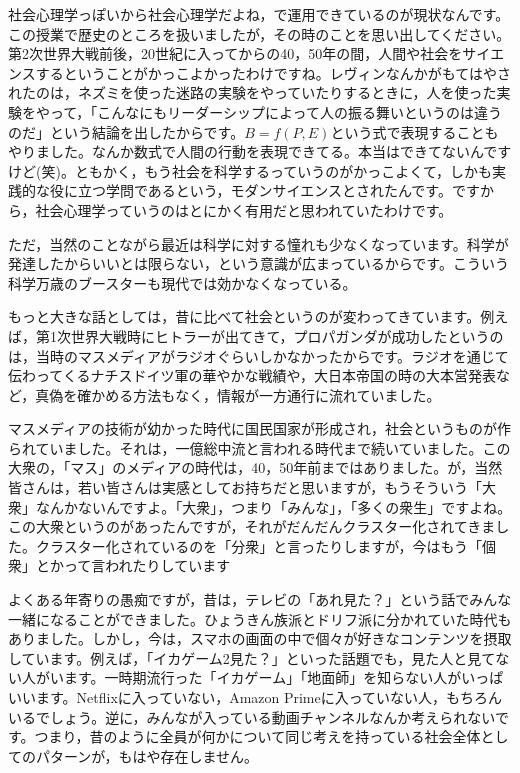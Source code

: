 \documentclass{ltjsbook}
\begin{document}
社会心理学っぽいから社会心理学だよね，で運用できているのが現状なんです。この授業で歴史のところを扱いましたが，その時のことを思い出してください。第2次世界大戦前後，20世紀に入ってからの40，50年の間，人間や社会をサイエンスするということがかっこよかったわけですね。レヴィンなんかがもてはやされたのは，ネズミを使った迷路の実験をやっていたりするときに，人を使った実験をやって，「こんなにもリーダーシップによって人の振る舞いというのは違うのだ」という結論を出したからです。$B=f(P,E)$という式で表現することもやりました。なんか数式で人間の行動を表現できてる。本当はできてないんですけど(笑)。ともかく，もう社会を科学するっていうのがかっこよくて，しかも実践的な役に立つ学問であるという，モダンサイエンスとされたんです。ですから，社会心理学っていうのはとにかく有用だと思われていたわけです。

ただ，当然のことながら最近は科学に対する憧れも少なくなっています。科学が発達したからいいとは限らない，という意識が広まっているからです。こういう科学万歳のブースターも現代では効かなくなっている。

もっと大きな話としては，昔に比べて社会というのが変わってきています。例えば，第1次世界大戦時にヒトラーが出てきて，プロパガンダが成功したというのは，当時のマスメディアがラジオぐらいしかなかったからです。ラジオを通じて伝わってくるナチスドイツ軍の華やかな戦績や，大日本帝国の時の大本営発表など，真偽を確かめる方法もなく，情報が一方通行に流れていました。

マスメディアの技術が幼かった時代に国民国家が形成され，社会というものが作られていました。それは，一億総中流と言われる時代まで続いていました。この大衆の，「マス」のメディアの時代は，40，50年前まではありました。が，当然皆さんは，若い皆さんは実感としてお持ちだと思いますが，もうそういう「大衆」なんかないんですよ。「大衆」，つまり「みんな」，「多くの衆生」ですよね。この大衆というのがあったんですが，それがだんだんクラスター化されてきました。クラスター化されているのを「分衆」と言ったりしますが，今はもう「個衆」とかって言われたりしています

よくある年寄りの愚痴ですが，昔は，テレビの「あれ見た？」という話でみんな一緒になることができました。ひょうきん族派とドリフ派に分かれていた時代もありました。しかし，今は，スマホの画面の中で個々が好きなコンテンツを摂取しています。例えば，「イカゲーム2見た？」といった話題でも，見た人と見てない人がいます。一時期流行った「イカゲーム」「地面師」を知らない人がいっぱいいます。Netflixに入っていない，Amazon Primeに入っていない人，もちろんいるでしょう。逆に，みんなが入っている動画チャンネルなんか考えられないです。つまり，昔のように全員が何かについて同じ考えを持っている社会全体としてのパターンが，もはや存在しません。
\end{document}
